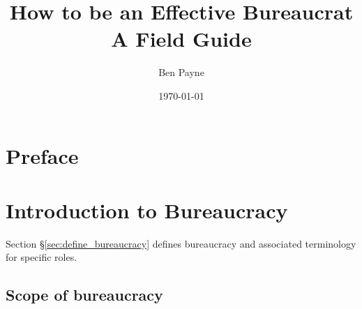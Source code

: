 \documentclass{book}
\title{How to be an Effective Bureaucrat\\
A Field Guide}
\author{Ben Payne}
\date{\today}
\begin{document}

\begin{titlepage}
\maketitle
\thispagestyle{empty}
\end{titlepage}
\clearpage

\frontmatter %

\clearpage

\chapter*{Preface}%

\hypertarget{contents}{}
\tableofcontents

\mainmatter %


\chapter{Introduction to Bureaucracy}

  Section \S\ref{sec:define_bureaucracy} defines bureaucracy and associated terminology for specific roles.

  \clearpage 
  \clearpage
  \clearpage 
  \clearpage
  \section{Scope of bureaucracy}
\end{document}

